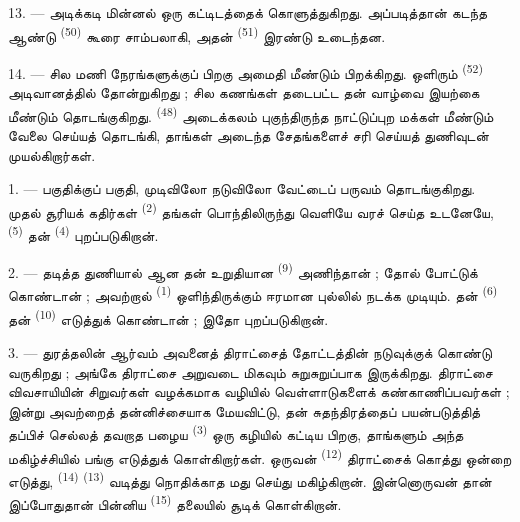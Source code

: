 13. --- அடிக்கடி மின்னல் ஒரு கட்டிடத்தைக் கொளுத்துகிறது. அப்படித்தான்
கடந்த ஆண்டு  \textsuperscript{(50)} கூரை சாம்பலாகி,
அதன்  \textsuperscript{(51)} இரண்டு உடைந்தன.

14. --- சில மணி நேரங்களுக்குப் பிறகு அமைதி மீண்டும் பிறக்கிறது.
ஒளிரும்  \textsuperscript{(52)} அடிவானத்தில் தோன்றுகிறது ;
சில கணங்கள் தடைபட்ட தன் வாழ்வை இயற்கை மீண்டும் தொடங்குகிறது.
 \textsuperscript{(48)} அடைக்கலம் புகுந்திருந்த
நாட்டுப்புற மக்கள் மீண்டும் வேலை செய்யத் தொடங்கி, தாங்கள் அடைந்த
சேதங்களைச் சரி செய்யத் துணிவுடன் முயல்கிறார்கள்.

\VUsaut{6.0mm}
\VUsaut{3.6mm}

\VUsaut{1.4mm}
\VUsaut{4.0mm}

1. --- பகுதிக்குப் பகுதி,  முடிவிலோ 
நடுவிலோ வேட்டைப் பருவம் தொடங்குகிறது. முதல் சூரியக் கதிர்கள்
 \textsuperscript{(2)} தங்கள் பொந்திலிருந்து வெளியே
வரச் செய்த உடனேயே,  \textsuperscript{(5)} தன்
 \textsuperscript{(4)} புறப்படுகிறான்.

2. --- தடித்த துணியால் ஆன தன் உறுதியான 
\textsuperscript{(9)} அணிந்தான் ; தோல்  போட்டுக்
கொண்டான் ; அவற்றால்  \textsuperscript{(1)} ஒளிந்திருக்கும்
ஈரமான புல்லில் நடக்க முடியும். தன் 
\textsuperscript{(6)} தன் 
\textsuperscript{(10)} எடுத்துக் கொண்டான் ; இதோ புறப்படுகிறான்.

3. --- துரத்தலின் ஆர்வம் அவனைத் திராட்சைத் தோட்டத்தின் நடுவுக்குக்
கொண்டு வருகிறது ; அங்கே திராட்சை அறுவடை மிகவும் சுறுசுறுப்பாக
இருக்கிறது. திராட்சை விவசாயியின் சிறுவர்கள் வழக்கமாக வழியில்
வெள்ளாடுகளைக் கண்காணிப்பவர்கள் ; இன்று அவற்றைத் தன்னிச்சையாக மேயவிட்டு,
தன் சுதந்திரத்தைப் பயன்படுத்தித் தப்பிச் செல்லத் தவறாத பழைய
 \textsuperscript{(3)} ஒரு கழியில் கட்டிய
பிறகு, தாங்களும் அந்த மகிழ்ச்சியில் பங்கு எடுத்துக் கொள்கிறார்கள்.
ஒருவன்  \textsuperscript{(12)}
திராட்சைக் கொத்து ஒன்றை எடுத்து,  \textsuperscript{(14)}
 \textsuperscript{(13)} வடித்து நொதிக்காத மது செய்து
மகிழ்கிறான். இன்னொருவன் தான் இப்போதுதான் பின்னிய  \textsuperscript{(15)} தலையில் சூடிக் கொள்கிறான்.

